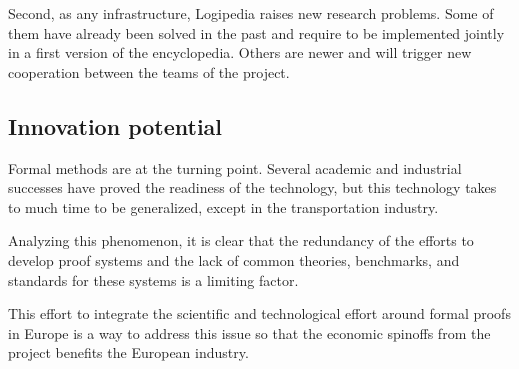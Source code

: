 Second, as any infrastructure, {\sc Logipedia} raises new research
problems. Some of them have already been solved in the past and
require to be implemented jointly in a first version of the
encyclopedia. Others are newer and will trigger new cooperation
between the teams of the project.


\subsection{Innovation potential}

Formal methods are at the turning point. Several academic and
industrial successes have proved the readiness of the technology, but
this technology takes to much time to be generalized, except in the
transportation industry.

Analyzing this phenomenon, it is clear that the redundancy of the
efforts to develop proof systems and the lack of common theories,
benchmarks, and standards for these systems is a limiting factor.

This effort to integrate the scientific and technological effort
around formal proofs in Europe is a way to address this issue so that 
the economic spinoffs from the project benefits the European industry.


